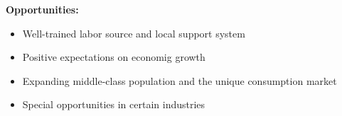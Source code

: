 \documentclass[a4paper]{extarticle}
\begin{document}
\textbf{Opportunities:}

\begin{itemize}
    \item Well-trained labor source and local support system
    \item Positive expectations on economig growth
    \item Expanding middle-class population and the unique consumption market
    \item Special opportunities in certain industries
\end{itemize}
\end{document}
